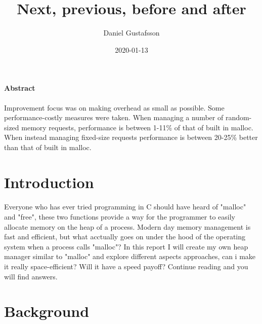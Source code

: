 \documentclass[11pt]{article}
\title{Next, previous, before and after}
\date{2020-01-13}
\author{Daniel Gustafsson}
\begin{document}
\maketitle
{}

\newpage
{}

\paragraph{Abstract}
Improvement focus was on making overhead as small as possible. Some performance-costly measures were taken. 
When managing a number of random-sized memory requests, performance is between 1-11\% of that of built in malloc.
When instead managing fixed-size requests performance is between 20-25\% better than that of built in malloc.

\section{Introduction}

\paragraph{}
Everyone who has ever tried programming in C should have heard of "malloc" and "free", these two functions provide a way for the programmer to easily
allocate memory on the heap of a process. Modern day memory management is fast and efficient, but what acctually goes on under the hood of the
operating system when a process calls "malloc"? In this report I will create my own heap manager similar to "malloc" and explore different aspects 
approaches, can i make it really space-efficient? Will it have a speed payoff? Continue reading and you will find answers.

\section{Background}
\end{document}
